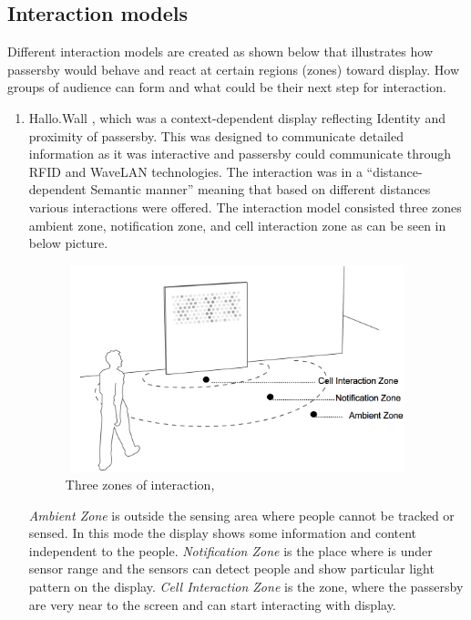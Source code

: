 \subsection{Interaction models}
Different interaction models are created as shown below that illustrates how passersby would behave and react at certain regions (zones) toward display. How groups of audience can form and what could be their next step for interaction. 

\begin{enumerate}

\item Hallo.Wall \cite{hello_wall, hellow_wall_2}, which was a context-dependent display reflecting Identity and proximity of passersby. This was designed to communicate detailed information as it was interactive and passersby could communicate through RFID and WaveLAN technologies. The interaction was in a ``distance-dependent Semantic manner'' meaning that based on different distances various interactions were offered. The interaction model consisted three zones ambient zone, notification zone, and cell interaction zone as can be seen in below picture. 

\begin{figure}[H]
\centering
\includegraphics[width=100mm,height=60mm]{Figures/2/hello_wall}
\caption{Three zones of interaction, \cite{hellow_wall_2}}
\label{fig:threezoneofinteraction}
\end{figure}

\emph{Ambient Zone} is outside the sensing area where people cannot be tracked or sensed. In this mode the display shows some information and content independent to the people. \emph{Notification Zone} is the place where is under sensor range and the sensors can detect people and show particular light pattern on the display. \emph{Cell Interaction Zone} is the zone, where the passersby are very near to the screen and can start interacting with display. 


\end{enumerate}
